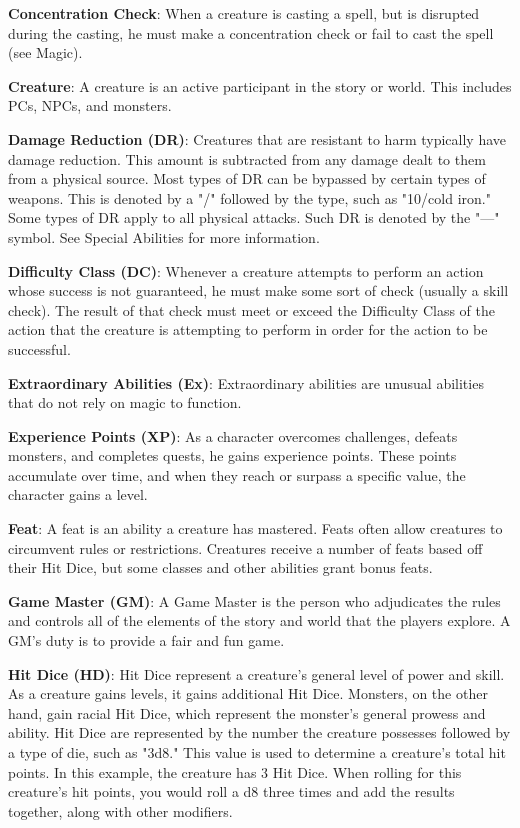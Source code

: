\textbf{Concentration Check}: When a creature is casting a spell, but is disrupted during the casting, he must make a concentration check or fail to cast the spell (see Magic).
				
\textbf{Creature}: A creature is an active participant in the story or world. This includes PCs, NPCs, and monsters.
				
\textbf{Damage Reduction (DR)}: Creatures that are resistant to harm typically have damage reduction. This amount is subtracted from any damage dealt to them from a physical source. Most types of DR can be bypassed by certain types of weapons. This is denoted by a "/" followed by the type, such as "10/cold iron." Some types of DR apply to all physical attacks. Such DR is denoted by the "---" symbol. See Special Abilities for more information.
				
\textbf{Difficulty Class (DC)}: Whenever a creature attempts to perform an action whose success is not guaranteed, he must make some sort of check (usually a skill check). The result of that check must meet or exceed the Difficulty Class of the action that the creature is attempting to perform in order for the action to be successful. 
				
\textbf{Extraordinary Abilities (Ex)}: Extraordinary abilities are unusual abilities that do not rely on magic to function.
				
\textbf{Experience Points (XP)}: As a character overcomes challenges, defeats monsters, and completes quests, he gains experience points. These points accumulate over time, and when they reach or surpass a specific value, the character gains a level.
				
\textbf{Feat}: A feat is an ability a creature has mastered. Feats often allow creatures to circumvent rules or restrictions. Creatures receive a number of feats based off their Hit Dice, but some classes and other abilities grant bonus feats.
				
\textbf{Game Master (GM)}: A Game Master is the person who adjudicates the rules and controls all of the elements of the story and world that the players explore. A GM's duty is to provide a fair and fun game.
				
\textbf{Hit Dice (HD)}: Hit Dice represent a creature's general level of power and skill. As a creature gains levels, it gains additional Hit Dice. Monsters, on the other hand, gain racial Hit Dice, which represent the monster's general prowess and ability. Hit Dice are represented by the number the creature possesses followed by a type of die, such as "3d8." This value is used to determine a creature's total hit points. In this example, the creature has 3 Hit Dice. When rolling for this creature's hit points, you would roll a d8 three times and add the results together, along with other modifiers.
				
